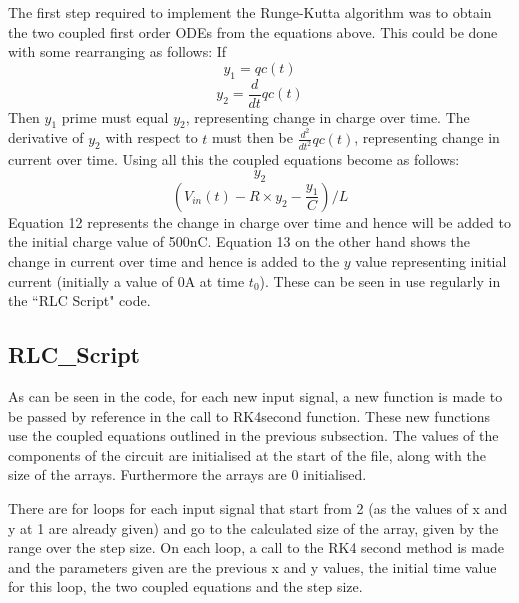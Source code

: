 \documentclass[a4paper, 12pt]{article}
\begin{document}
The first step required to implement the Runge-Kutta algorithm was to obtain the two coupled first order ODEs from the equations above. This could be done with some rearranging as follows:
\linebreak
\linebreak
If
\begin{equation}
y_{1} = qc(t)
\end{equation}
\begin{equation}
y_{2} = \frac{d}{dt}qc(t)
\end{equation}
\linebreak
Then $y_{1}$ prime must equal $y_{2}$, representing change in charge over time. The derivative of $y_{2}$ with respect to $t$ must then be $\frac{d^2}{dt^2}qc(t)$, representing change in current over time. Using all this the coupled equations become as follows:
\begin{equation}
y_{2}
\end{equation}
\begin{equation}
(V_{in}(t)-R\times y_{2}-\frac{y_{1}}{C})/L
\end{equation}
\linebreak
Equation 12 represents the change in charge over time and hence will be added to the initial charge value of 500nC. Equation 13 on the other hand shows the change in current over time and hence is added to the $y$ value representing initial current (initially a value of 0A at time $t_{0}$).
\linebreak
These can be seen in use regularly in the ``RLC Script" code.

\subsection{RLC\_Script}




As can be seen in the code, for each new input signal, a new function is made to be passed by reference in the call to RK4second function. These new functions use the coupled equations outlined in the previous subsection. The values of the components of the circuit are initialised at the start of the file, along with the size of the arrays. Furthermore the arrays are 0 initialised.

There are for loops for each input signal that start from 2 (as the values of x and y at 1 are already given) and go to the calculated size of the array, given by the range over the step size. On each loop, a call to the RK4 second method is made and the parameters given are the previous x and y values, the initial time value for this loop, the two coupled equations and the step size. 
\end{document}
